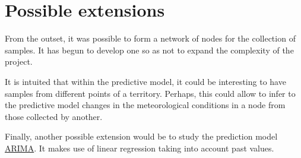 \section{Possible extensions}
From the outset, it was possible to form a network of nodes for the collection of samples. It has begun to develop one so as not to expand the complexity of the project.

It is intuited that within the predictive model, it could be interesting to have samples from different points of a territory. Perhaps, this could allow to infer to the predictive model changes in the meteorological conditions in a node from those collected by another.

Finally, another possible extension would be to study the prediction model \href{https://www.analyticsvidhya.com/blog/2016/02/time-series-forecasting-codes-python/}{ARIMA}. It makes use of linear regression taking into account past values.